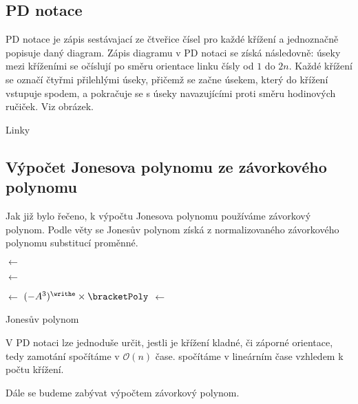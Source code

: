 \subsection{PD notace} 

PD notace je zápis sestávajací ze čtveřice čísel pro každé křížení a jednoznačně popisuje daný diagram. Zápis diagramu v PD notaci se získá následovně: úseky mezi kříženími se očíslují po směru orientace linku čísly od $1$ do $2 n$. Každé křížení se označí čtyřmi přilehlými úseky, přičemž se začne úsekem, který do křížení vstupuje spodem, a pokračuje se s úseky navazujícími proti směru hodinových ručiček. Viz obrázek.

Linky

\subsection{Výpočet Jonesova polynomu ze závorkového polynomu}

Jak již bylo řečeno, k výpočtu Jonesova polynomu používáme závorkový polynom. Podle věty se Jonesův polynom získá z normalizovaného závorkového polynomu substitucí proměnné. 

\begin{algorithm}[H]
\DontPrintSemicolon
{}


\BlankLine

\bracketPoly $\leftarrow$ 

\writhe $\leftarrow$ 

\normal $\leftarrow$ $ (-A^3)^{\writhe} \times \bracketPoly $
\jones $\leftarrow$ 

\KwRet \jones 

\caption{Jonesův polynom} 
\end{algorithm}

V PD notaci lze jednoduše určit, jestli je křížení kladné, či záporné orientace, tedy zamotání spočítáme v $\mathcal{O} (n)$ čase.
spočítáme v lineárním čase vzhledem k počtu křížení.

Dále se budeme zabývat výpočtem závorkový polynom.



